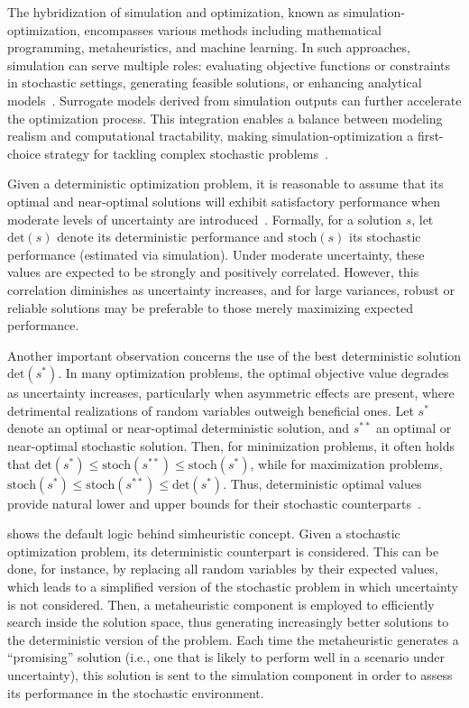 The hybridization of simulation and optimization, known as
simulation-optimization, encompasses various methods including mathematical
programming, metaheuristics, and machine learning. In such approaches,
simulation can serve multiple roles: evaluating objective functions or
constraints in stochastic settings, generating feasible solutions, or enhancing
analytical models~\cite{juan:2015}. Surrogate models derived from simulation
outputs can further accelerate the optimization process. This integration
enables a balance between modeling realism and computational tractability,
making simulation-optimization a first-choice strategy for tackling complex
stochastic problems~\cite{juan:2022}.

Given a deterministic optimization problem, it is reasonable to assume that its
optimal and near-optimal solutions will exhibit satisfactory performance when
moderate levels of uncertainty are introduced~\cite{juan:2022}. Formally, for a
solution $s$, let $\text{det}(s)$ denote its deterministic performance and
$\text{stoch}(s)$ its stochastic performance (estimated via simulation). Under
moderate uncertainty, these values are expected to be strongly and positively
correlated. However, this correlation diminishes as uncertainty increases, and
for large variances, robust or reliable solutions may be preferable to those
merely maximizing expected performance.

Another important observation concerns the use of the best deterministic
solution $\text{det}(s^*)$. In many optimization problems, the optimal objective
value degrades as uncertainty increases, particularly when asymmetric effects
are present, where detrimental realizations of random variables outweigh
beneficial ones. Let $s^*$ denote an optimal or near-optimal deterministic
solution, and $s^{**}$ an optimal or near-optimal stochastic solution. Then, for
minimization problems, it often holds that $\text{det}(s^*) \leq
	\text{stoch}(s^{**}) \leq \text{stoch}(s^*)$, while for maximization problems,
$\text{stoch}(s^*) \leq \text{stoch}(s^{**}) \leq \text{det}(s^*)$. Thus,
deterministic optimal values provide natural lower and upper bounds for their
stochastic counterparts~\cite{juan:2022}.

 shows the default logic behind simheuristic
concept. Given a stochastic optimization problem, its deterministic counterpart
is considered. This can be done, for instance, by replacing all random variables
by their expected values, which leads to a simplified version of the stochastic
problem in which uncertainty is not considered. Then, a metaheuristic component
is employed to efficiently search inside the solution space, thus generating
increasingly better solutions to the deterministic version of the problem. Each
time the metaheuristic generates a ``promising'' solution (i.e., one that is
likely to perform well in a scenario under uncertainty), this solution is sent
to the simulation component in order to assess its performance in the stochastic
environment.

